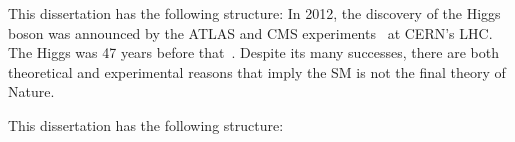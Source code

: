 This dissertation has the following structure:
In 2012, the discovery of the Higgs boson was announced by the ATLAS and CMS experiments~\cite{Higgs_discovery_2012_CMS,Higgs_discovery_2012_ATLAS,Higgs_discovery_2013_CMS} at CERN's LHC.
The Higgs was 47 years before that~\cite{Higgs_theory1,Higgs_theory2}.
Despite its many successes, there are both theoretical and experimental reasons that imply the SM is not the final theory of Nature.

This dissertation has the following structure:
